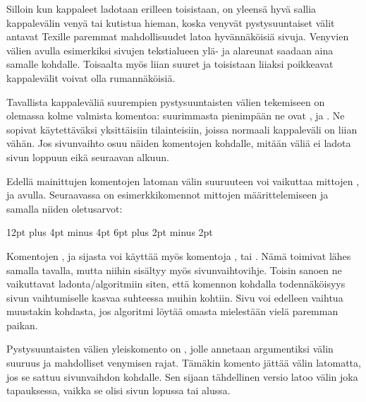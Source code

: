 \begin{koodilohkosis}
\setlength{\parskip}{1.3ex plus .2ex minus .1ex}
\end{koodilohkosis}

\noindent
Silloin kun kappaleet ladotaan erilleen toisistaan, on yleensä hyvä
sallia kappalevälin venyä tai kutistua hieman, koska venyvät
pystysuuntaiset välit antavat Texille paremmat mahdollisuudet latoa
hyvännäköisiä sivuja. Venyvien välien avulla esimerkiksi sivujen
tekstialueen ylä- ja alareunat saadaan aina samalle kohdalle. Toisaalta
myös liian suuret ja toisistaan liiaksi poikkeavat kappalevälit voivat
olla rumannäköisiä.

Tavallista kappaleväliä suurempien pystysuuntaisten välien tekemiseen on
olemassa kolme valmista komentoa: suurimmasta pienimpään ne ovat
,  ja . Ne
sopivat käytettäväksi yksittäisiin tilainteisiin, joissa normaali
kappaleväli on liian vähän. Jos sivunvaihto osuu näiden komentojen
kohdalle, mitään väliä ei ladota sivun loppuun eikä seuraavan alkuun.

Edellä mainittujen komentojen latoman välin suuruuteen voi vaikuttaa
mittojen ,  ja
 avulla. Seuraavassa on esimerkkikomennot
mittojen määrittelemiseen ja samalla niiden oletusarvot:

\begin{koodilohkosis}
\setlength{\bigskipamount} {12pt plus 4pt minus 4pt}
\setlength{\medskipamount}  {6pt plus 2pt minus 2pt}
\setlength{\smallskipamount}{3pt plus 1pt minus 1pt}
\end{koodilohkosis}

\noindent
Komentojen ,  ja 
sijasta voi käyttää myös komentoja ,
 tai . Nämä toimivat lähes
samalla tavalla, mutta niihin sisältyy myös sivunvaihtovihje. Toisin
sanoen ne vaikuttavat ladonta\-/algoritmiin siten, että komennon
kohdalla todennäköisyys sivun vaihtumiselle kasvaa suhteessa muihin
kohtiin. Sivu voi edelleen vaihtua muustakin kohdasta, jos algoritmi
löytää omasta mielestään vielä paremman paikan.

Pystysuuntaisten välien yleiskomento on , jolle
annetaan argumentiksi välin suuruus ja mahdolliset venymisen rajat.
Tämäkin komento jättää välin latomatta, jos se sattuu sivunvaihdon
kohdalle. Sen sijaan tähdellinen versio  latoo välin
joka tapauksessa, vaikka se olisi sivun lopussa tai alussa.

